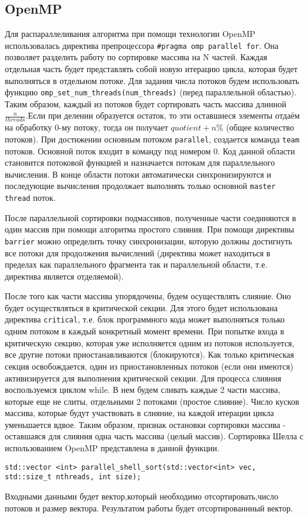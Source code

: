 \documentclass{report}
\begin{document}
\subsection*{OpenMP}
\par Для распараллеливания алгоритма при помощи технологии OpenMP использовалась директива препроцессора \verb|#pragma omp parallel for|. Она позволяет разделить работу по сортировке массива на N частей. Каждая отдельная часть будет представлять собой новую итерацию цикла, которая будет выполняться в отдельном потоке. Для задания числа потоков будем использовать функцию \verb|omp_set_num_threads(num_threads)| (перед параллельной областью). Таким образом, каждый из потоков будет сортировать часть массива длинной $\frac{n}{threads}$.Если при делении образуется остаток, то эти оставшиеся элементы отдаём на обработку 0-му потоку, тогда он получает $quotient + n \%$ (общее количество потоков). При достижении основным потоком \verb|parallel|, создается команда \verb|team| потоков. Основной поток входит в команду под номером 0. Код данной области становится потоковой функцией и назначается потокам для параллельного вычисления. В конце области потоки автоматически синхронизируются и последующие вычисления продолжает выполнять только основной \verb|master thread| поток.
\par После параллельной сортировки подмассивов, полученные части соединяются в один массив при помощи алгоритма простого слияния. При помощи директивы \verb|barrier| можно определить точку синхронизации, которую должны
достигнуть все потоки для продолжения вычислений (директива может находиться в пределах как
параллельного фрагмента так и параллельной области, т.е. директива является отделяемой).

\par После того как части массива упорядочены, будем осуществлять слияние. Оно будет осуществляться в критической секции. Для этого будет использована директива \verb|critical|, т.е. блок программного кода может выполняться только одним потоком в каждый конкретный момент времени. При попытке входа в критическую секцию, которая уже исполняется одним из потоков используется, все другие потоки приостанавливаются (блокируются). Как только критическая секция
освобождается, один из приостановленных потоков (если они имеются) активизируется для выполнения критической секции. Для процесса слияния воспользуемся циклом while. В нем будем сливать каждые 2 части массива, которые еще не слиты, отдельными 2 потоками (простое слияние). Число кусков массива, которые будут участвовать в слияние, на каждой итерации цикла уменьшается вдвое. Таким образом, признак остановки сортировки массива - оставшаяся для слияния одна часть массива (целый массив).
Сортировка Шелла с использованием OpenMP представлена в данной функции.
\begin{lstlisting}
std::vector <int> parallel_shell_sort(std::vector<int> vec, std::size_t nthreads, int size);
\end{lstlisting}
Входными данными будет вектор,который необходимо отсортировать,число потоков и размер вектора. Результатом работы будет отсортированнный вектор.
\end{document}
